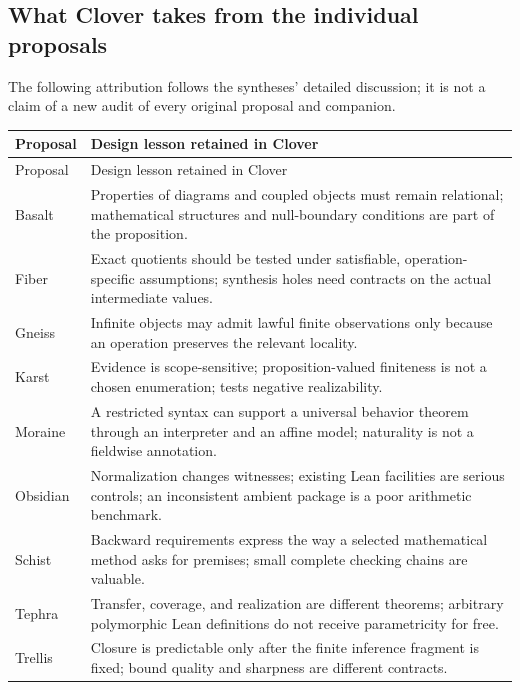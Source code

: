\documentclass[11pt,a4paper]{article}
\newcommand{\code}[1]{\texttt{\detokenize{#1}}}
\theoremstyle{definition}
\theoremstyle{remark}
\begin{document}
\subsection{What Clover takes from the individual proposals}

The following attribution follows the syntheses' detailed discussion; it is
not a claim of a new audit of every original proposal and companion.

\begin{center}\small
\begin{longtable}{@{}P{.18\textwidth}P{.73\textwidth}@{}}
\toprule
Proposal & Design lesson retained in Clover\\\midrule\endfirsthead
\toprule Proposal & Design lesson retained in Clover\\\midrule\endhead
\bottomrule\endfoot
Basalt & Properties of diagrams and coupled objects must remain relational; mathematical structures and null-boundary conditions are part of the proposition.\\
Fiber & Exact quotients should be tested under satisfiable, operation-specific assumptions; synthesis holes need contracts on the actual intermediate values.\\
Gneiss & Infinite objects may admit lawful finite observations only because an operation preserves the relevant locality.\\
Karst & Evidence is scope-sensitive; proposition-valued finiteness is not a chosen enumeration; \code{List Empty} tests negative realizability.\\
Moraine & A restricted syntax can support a universal behavior theorem through an interpreter and an affine model; naturality is not a fieldwise annotation.\\
Obsidian & Normalization changes witnesses; existing Lean facilities are serious controls; an inconsistent ambient package is a poor arithmetic benchmark.\\
Schist & Backward requirements express the way a selected mathematical method asks for premises; small complete checking chains are valuable.\\
Tephra & Transfer, coverage, and realization are different theorems; arbitrary polymorphic Lean definitions do not receive parametricity for free.\\
Trellis & Closure is predictable only after the finite inference fragment is fixed; bound quality and sharpness are different contracts.\\
\end{longtable}
\end{center}
\end{document}
